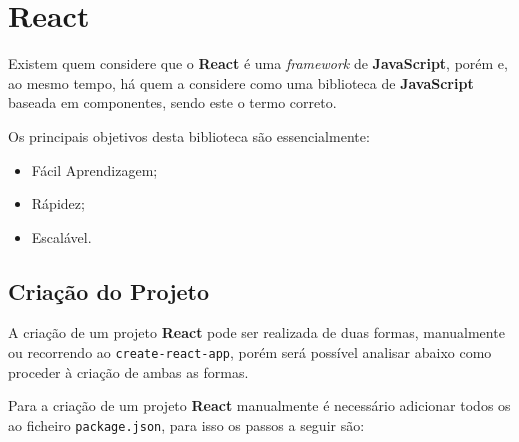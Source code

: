 \section{React}

\begin{minipage}[t]{.3\textwidth}
\end{minipage}
\begin{minipage}[t]{.7\textwidth}
	\minipagerestore
	Existem quem considere que o \textbf{React} é uma \textit{framework} de \textbf{JavaScript}, porém e, ao mesmo tempo, há quem a considere como uma biblioteca de \textbf{JavaScript} baseada em componentes, sendo este o termo correto.

	Os principais objetivos desta biblioteca são essencialmente:

	\begin{itemize}
		\item Fácil Aprendizagem;
		\item Rápidez;
		\item Escalável.
	\end{itemize}
\end{minipage}


\subsection{Criação do Projeto}

A criação de um projeto \textbf{React} pode ser realizada de duas formas, manualmente ou recorrendo ao \texttt{create-react-app}, porém será possível analisar abaixo como proceder à criação de ambas as formas.

Para a criação de um projeto \textbf{React} manualmente é necessário adicionar todos os \textit{} ao ficheiro \texttt{package.json}, para isso os passos a seguir são:

